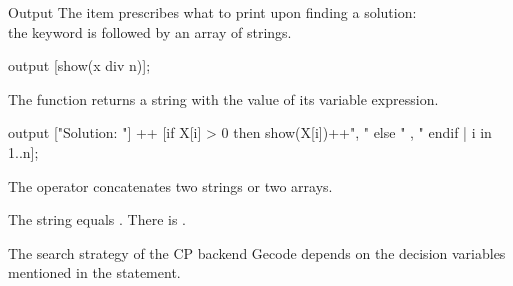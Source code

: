 \documentclass{cons-beamer}
\begin{document}
\begin{flashcardminizinc}
\begin{frame}[fragile]{Output}
  The  item prescribes what to print upon finding a
  solution: \\ the keyword  is followed by an array
  of strings. \vfill

  \begin{mznno}
  output [show(x div n)];
  \end{mznno}
  \vfill

  The function  returns a string with the value of its
  variable expression. \vfill

  \begin{mznno}
  output ["Solution: "] ++ [if X[i] > 0 then show(X[i])++", " else " , " endif | i in 1..n];
  \end{mznno}
  \vfill

  The operator \mzninline{++} concatenates two strings or two arrays.
  \vfill

  The string  equals
  .
  There is .\vfill

  \alert{The search strategy of the CP backend Gecode depends on the
    decision variables mentioned in the  statement.}
\end{frame}


\end{flashcardminizinc}
\end{document}
